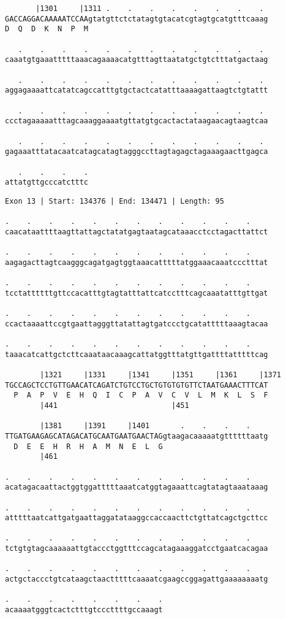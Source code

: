 \documentclass{article}
\begin{document}
\begin{Verbatim}
       |1301     |1311 .    .    .    .    .    .    .    . 
GACCAGGACAAAAATCCAAgtatgttctctatagtgtacatcgtagtgcatgtttcaaag
D  Q  D  K  N  P  M                                         
  
   .    .    .    .    .    .    .    .    .    .    .    . 
caaatgtgaaatttttaaacagaaaacatgtttagttaatatgctgtctttatgactaag
  
   .    .    .    .    .    .    .    .    .    .    .    . 
aggagaaaattcatatcagccatttgtgctactcatatttaaaagattaagtctgtattt
  
   .    .    .    .    .    .    .    .    .    .    .    . 
ccctagaaaaatttagcaaaggaaaatgttatgtgcactactataagaacagtaagtcaa
  
   .    .    .    .    .    .    .    .    .    .    .    . 
gagaaatttatacaatcatagcatagtagggccttagtagagctagaaagaacttgagca
  
   .    .    .    .
attatgttgcccatctttc
\end{Verbatim}
\newpage
\begin{Verbatim}
Exon 13 | Start: 134376 | End: 134471 | Length: 95
 
.    .    .    .    .    .    .    .    .    .    .    .    
caacataattttaagttattagctatatgagtaatagcataaacctcctagacttattct
  
.    .    .    .    .    .    .    .    .    .    .    .    
aagagacttagtcaagggcagatgagtggtaaacatttttatggaaacaaatccctttat
  
.    .    .    .    .    .    .    .    .    .    .    .    
tcctattttttgttccacatttgtagtatttattcatcctttcagcaaatatttgttgat
  
.    .    .    .    .    .    .    .    .    .    .    .    
ccactaaaattccgtgaattagggttatattagtgatccctgcatatttttaaagtacaa
  
.    .    .    .    .    .    .    .    .    .    .    .    
taaacatcattgctcttcaaataacaaagcattatggtttatgttgattttatttttcag
  
        |1321     |1331     |1341     |1351     |1361     |1371
TGCCAGCTCCTGTTGAACATCAGATCTGTCCTGCTGTGTGTGTTCTAATGAAACTTTCAT
  P  A  P  V  E  H  Q  I  C  P  A  V  C  V  L  M  K  L  S  F
        |441                          |451                  
  
        |1381     |1391     |1401       .    .    .    .    
TTGATGAAGAGCATAGACATGCAATGAATGAACTAGgtaagacaaaaatgttttttaatg
  D  E  E  H  R  H  A  M  N  E  L  G                        
        |461                                                
  
.    .    .    .    .    .    .    .    .    .    .    .    
acatagacaattactggtggatttttaaatcatggtagaaattcagtatagtaaataaag
  
.    .    .    .    .    .    .    .    .    .    .    .    
atttttaatcattgatgaattaggatataaggccaccaacttctgttatcagctgcttcc
  
.    .    .    .    .    .    .    .    .    .    .    .    
tctgtgtagcaaaaaattgtaccctggtttccagcatagaaaggatcctgaatcacagaa
  
.    .    .    .    .    .    .    .    .    .    .    .    
actgctaccctgtcataagctaactttttcaaaatcgaagccggagattgaaaaaaaatg
  
.    .    .    .    .    .    .    .
acaaaatgggtcactctttgtcccttttgccaaagt
\end{Verbatim}
\end{document}
